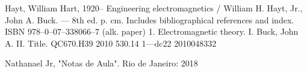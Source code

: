 \documentclass[journal,comsoc]{IEEEtran}
\begin{document}

\begin{thebibliography}{1}

Hayt, William Hart, 1920–
Engineering electromagnetics / William H. Hayt, Jr., John A. Buck. — 8th ed.
p. cm.
Includes bibliographical references and index.
ISBN 978–0–07–338066–7 (alk. paper)
1. Electromagnetic theory. I. Buck, John A. II. Title.
QC670.H39 2010
530.14
1—dc22 2010048332

Nathanael Jr, "Notas de Aula". Rio de Janeiro: 2018



\end{thebibliography}
\end{document}
